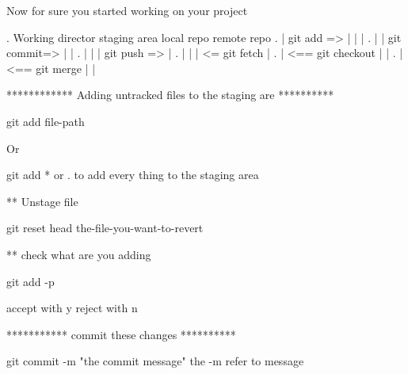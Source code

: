 Now for sure you started working on your project 


. Working director       staging area      local repo        remote repo 
.        |   git add =>        |                |                  |
.        |                     | git commit=>   |                  |
.        |                     |                |   git push =>    |         
.        |                     |                |   <= git fetch   |
.        |              <== git checkout        |                  |
.        |               <==  git merge         |                  |


************  Adding untracked files to the staging are **********

git add file-path 

Or  

git add *   or .   to add every thing to the staging area 

** Unstage file  

git reset head the-file-you-want-to-revert

** check what are you adding 

git add -p 

accept with y  reject with n 

*********** commit these changes **********

git commit -m "the commit message"
  the -m refer to message   